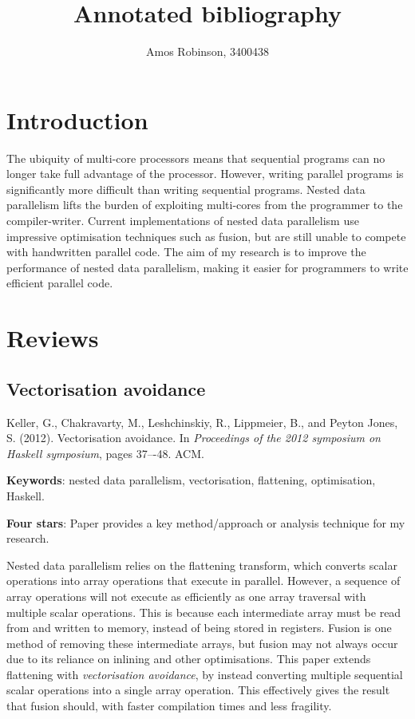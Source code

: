 \documentclass[12pt,a4paper]{article}
\author{Amos Robinson, 3400438}
\title{Annotated bibliography}
\begin{document}
\maketitle
\thispagestyle{myheadings}

\onehalfspacing

\section{Introduction}
The ubiquity of multi-core processors means that sequential programs can no longer take full advantage of the processor.
However, writing parallel programs is significantly more difficult than writing sequential programs.
Nested data parallelism lifts the burden of exploiting multi-cores from the programmer to the compiler-writer.
Current implementations of nested data parallelism use impressive optimisation techniques such as fusion, but are still unable to compete with handwritten parallel code.
The aim of my research is to improve the performance of nested data parallelism, making it easier for programmers to write efficient parallel code.



\section{Reviews}

\subsection{Vectorisation avoidance}
\cite{keller2012vectorisation}
Keller, G., Chakravarty, M., Leshchinskiy, R., Lippmeier, B., and Peyton Jones, S. (2012). Vectorisation avoidance. In \emph{Proceedings of the 2012 symposium on Haskell symposium}, pages 37–-48. ACM.

{\bf Keywords}: nested data parallelism, vectorisation, flattening, optimisation, Haskell.

{\bf Four stars}: Paper provides a key method/approach or analysis technique for my research.

Nested data parallelism relies on the flattening transform, which converts scalar operations into array operations that execute in parallel.
However, a sequence of array operations will not execute as efficiently as one array traversal with multiple scalar operations.
This is because each intermediate array must be read from and written to memory, instead of being stored in registers.
Fusion is one method of removing these intermediate arrays, but fusion may not always occur due to its reliance on inlining and other optimisations. 
This paper extends flattening with \emph{vectorisation avoidance}, by instead converting multiple sequential scalar operations into a single array operation.
This effectively gives the result that fusion should, with faster compilation times and less fragility.
\end{document}
